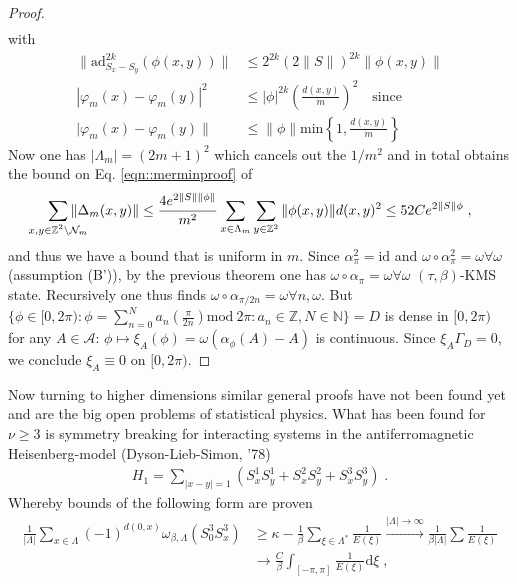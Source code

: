 \documentclass[
a4paper, %
11pt, %
onecolumn, %
openany, %
]{memoir}
\theoremstyle{definition}
\theoremstyle{remark}
\theoremstyle{plain}
\begin{document}
\begin{proof}
\begin{align}
\end{align}
with \begin{align}
\| \mathrm{ad}_{S_x-S_y}^{2k}(\phi(x,y))\| &\leq 2^{2k}(2\| S\| )^{2k}\|\phi(x,y)\|\\
|\varphi_m(x)-\varphi_m(y)|^2&\leq |\phi|^{2k}\left(\frac{d(x,y)}{m}\right)^2 \quad \text{since} \\|\varphi_m(x)-\varphi_m(y)\|&\leq \|\phi\| \text{min}\left\{1,\frac{d(x,y)}{m}\right\}
\end{align}
Now one has $|\Lambda_m|=(2m+1)^2$ which cancels out the $1/m^2$ and in total obtains the bound on Eq. \eqref{eqn::merminproof} of \begin{align}
\sum_{\mathclap{x,y\in\mathbb{Z}^2\setminus\mathcal{N}_m}}\|\Delta_m(x,y)\| \leq \frac{4 e^{2\|S\|\|\phi\|}}{m^2}\sum_{x\in\Lambda_m}\sum_{y\in\mathbb{Z}^2}\|\phi(x,y)\| d(x,y)^2 \leq 52 C e^{2\|S\|\phi}\; ,
\end{align}
and thus we have a bound that is uniform in $m$. Since $\alpha_{\pi}^2=\mathrm{id}$ and $\omega\circ \alpha_{\pi}^2=\omega\forall \omega$ (assumption (B')), by the previous theorem one has $\omega\circ\alpha_{\pi}=\omega \forall \omega$ $(\tau,\beta)$-KMS state. Recursively one thus finds $\omega\circ\alpha_{\pi/2n}=\omega \forall n,\omega$. But $\{\phi\in[0,2\pi):\phi=\sum_{n=0}^N a_n\left(\frac{\pi}{2n}\right)\mathrm{mod}~2\pi:a_n\in\mathbb{Z}, N\in\mathbb{N}\}=D$ is dense in $[0,2\pi)$ for any $A\in\mathcal{A}$: $\phi\mapsto\xi_A(\phi)=\omega(\alpha_{\phi}(A)-A)$ is continuous. Since $\xi_A\Gamma_D=0$, we conclude $\xi_A\equiv 0$ on $[0,2\pi)$.
\end{proof}
Now turning to higher dimensions similar general proofs have not been found yet and are the big open problems of statistical physics. What has been found for $\nu\geq 3$ is symmetry breaking for interacting systems in the antiferromagnetic Heisenberg-model (Dyson-Lieb-Simon, '78) \begin{align}
H_1 = \sum_{|x-y|=1}(S_x^1S_y^1+S_x^2S_y^2+S_x^3S_y^3)\; .
\end{align}
Whereby bounds of the following form are proven \begin{align}
\frac{1}{|\Lambda|}\sum_{x\in\Lambda}(-1)^{d(0,x)}\omega_{\beta,\Lambda}(S_0^3S_x^3)&\geq \kappa - \frac{1}{\beta }\sum_{\xi\in\Lambda^*}\frac{1}{E(\xi)}\overset{|\Lambda|\rightarrow\infty}{\longrightarrow}\frac{1}{\beta|\Lambda|}\sum\frac{1}{E(\xi)}\\&\rightarrow \frac{C}{\beta} \int_{[-\pi,\pi]}\frac{1}{E(\xi)}\mathrm{d}\xi\; ,
\end{align}
\end{document}
